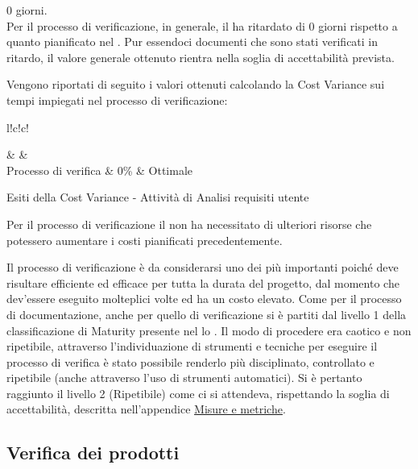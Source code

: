 \documentclass[a4paper, titlepage]{article}
\begin{document}
\begin{description}
\item{} 0 giorni.
\\Per il processo di verificazione, in generale, il  ha ritardato di 0 giorni rispetto a quanto pianificato nel . Pur essendoci documenti che sono stati verificati in ritardo, il valore generale ottenuto rientra nella soglia di accettabilità prevista.
\end{description}

Vengono riportati di seguito i valori ottenuti calcolando la Cost Variance sui tempi impiegati nel processo di verificazione:
\begin{tabella}{l!{\VRule}c!{\VRule}c!{\VRule}}
	
	\color{white}  & \color{white}  &\color{white}  \\
	\endfirsthead
	Processo di verifica & 0\% & Ottimale\\
	\caption{Esiti della Cost Variance - Attività di Analisi requisiti utente}	  
\end{tabella}

 Per il processo di verificazione il  non ha necessitato di ulteriori risorse che potessero aumentare i costi pianificati precedentemente.

Il processo di verificazione è da considerarsi uno dei più importanti poiché deve risultare efficiente ed efficace per tutta la durata del progetto, dal momento che dev'essere eseguito molteplici volte ed ha un costo elevato.
\newline Come per il processo di documentazione, anche per quello di verificazione si è partiti dal livello 1 della classificazione di Maturity presente nel lo . Il modo di procedere era caotico e non ripetibile, attraverso l'individuazione di strumenti e tecniche per eseguire il processo di verifica è stato possibile renderlo più disciplinato, controllato e ripetibile (anche attraverso l'uso di strumenti automatici).
\newline Si è pertanto raggiunto il livello 2 (Ripetibile) come ci si attendeva, rispettando la soglia di accettabilità, descritta nell'appendice \hyperref[sec:metr]{Misure e metriche}.

\subsection{Verifica dei prodotti}
\end{document}
